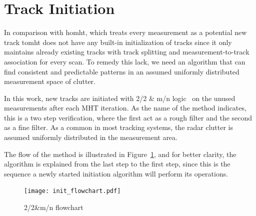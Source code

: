 \section{Track Initiation}
In comparison with \gls{homht}, which treats every measurement as a potential new track 
 \gls{tomht} does not have any built-in initialization of tracks since it only maintains already existing tracks with track splitting and measurement-to-track association for every scan. To remedy this lack, we need an algorithm that can find consistent and predictable patterns in an assumed uniformly distributed measurement space of clutter. 

In this work, new tracks are initiated with 2/2 \& m/n logic~\cite{Vo2015} on the unused measurements after each MHT iteration. As the name of the method indicates, this is a two step verification, where the first act as a rough filter and the second as a fine filter. As a common in most tracking systems, the radar clutter is assumed uniformly distributed in the measurement area. 

The flow of the method is illustrated in Figure~\ref{fig:init_flowchart}, and for better clarity, the algorithm is explained from the last step to the first step, since this is the sequence a newly started initiation algorithm will perform its operations.
\begin{figure}[H]
\centering
\texttt{[image: init\_flowchart.pdf]}
\caption{2/2\&m/n flowchart}\label{fig:init_flowchart}
\end{figure}

